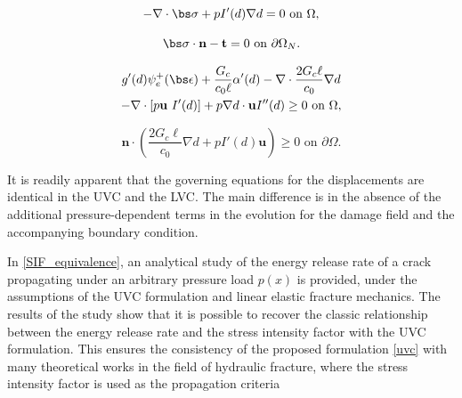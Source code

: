 \begin{mdframed}[
    frametitle={\begin{equation}\label{lvc}\tag{LVC}\text{Loaded Virtual Crack Formulation}\end{equation}},
    frametitlebackgroundcolor=gray!20,
    backgroundcolor=gray!5,
    linewidth=0pt,
    nobreak=true
  ]
  
\begin{equation}\label{disp equation box2}
    -\nabla \cdot \bs\sigma  + pI'(d) \nabla d = 0 \text{ on }\Omega,
\end{equation}

\begin{equation}\label{disp bcs box2}
    \bs\sigma\cdot \textbf{n} - \textbf{t} = 0 \text{ on }\partial\Omega_N.
\end{equation}

\begin{multline}\label{wet damage equation box2}
    g'(d) \psi_e^+(\bs\epsilon)
    + \dfrac{G_c}{c_0\ell}\alpha'(d) - \nabla \cdot \dfrac{2G_c\ell}{c_0}\nabla d \\ - \nabla \cdot [p\textbf{u}\ I'(d)] + p\nabla d\cdot \textbf{u}I''(d) \ge 0 \text{ on }\Omega,
\end{multline}
    
\begin{equation}\label{wet damage bcs box2}
    \textbf{n}\cdot \left(\dfrac{2G_c\ell}{c_0}\nabla d+   pI'(d)\textbf{u}\right) \ge 0 \text{ on }\partial\Omega.
\end{equation}
  
\end{mdframed}

\noindent It is readily apparent that the governing equations for the displacements are identical in the UVC and the LVC. The main difference is in the absence of the additional pressure-dependent terms in the evolution for the damage field and the accompanying boundary condition.  

In \ref{SIF_equivalence}, an analytical study of the energy release rate of a crack propagating under an arbitrary pressure load $p(x)$ is provided, under the assumptions of the UVC formulation and linear elastic fracture mechanics. The results of the study show that it is possible to recover the classic relationship between the energy release rate and the stress intensity factor with the UVC formulation. This ensures the consistency of the proposed formulation \eqref{uvc} with many theoretical works \cite{detournay2016mechanics, garagash2000tip, detournay2004propagation, garagash2005plane, bunger2005toughness} in the field of hydraulic fracture, where the stress intensity factor is used as the propagation criteria

